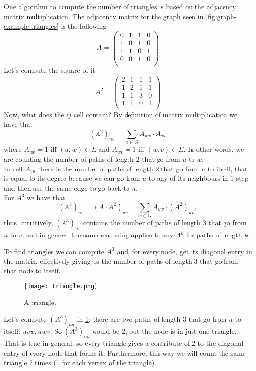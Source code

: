 One algorithm to compute the number of triangles is based on the adjacency matrix multiplication.
The adjacency matrix for the graph seen in \cref{fig:graph-example-triangles} is the following
\[
	A = \begin{pmatrix}
		0 & 1 & 1 & 0 \\
		1 & 0 & 1 & 0 \\
		1 & 1 & 0 & 1 \\
		0 & 0 & 1 & 0 \\
	\end{pmatrix}
\]
Let's compute the square of it.
\[
	A^2 = 	\begin{pmatrix}
		2 & 1 & 1 & 1 \\
		1 & 2 & 1 & 1 \\
		1 & 1 & 3 & 0 \\
		1 & 1 & 0 & 1 \\
	\end{pmatrix}
\]
Now, what does the $ij$ cell contain? By definition of matrix multiplication we have that
\[
	(A^2)_{uv} = \sum_{w \in G}A_{uw} \cdot A_{wv}
\]
where $A_{uw} = 1$ iff $(u,w) \in E$ and $A_{wv} = 1$ iff $(w,v) \in E$. In other words, we are counting the number of paths of length $2$ that go from $u$ to $w$.\\
In cell $A_{uu}$ there is the number of paths of length $2$ that go from $u$ to itself, that is equal to its degree because we can go from $u$ to any of its neighbours in $1$ step and then use the same edge to go back to $u$.\\
For $A^3$ we have that
\[
    (A^3)_{uv} = \left( A \cdot A^2 \right)_{uv} = \sum_{w \in G} A_{uw} \cdot (A^2)_{wv},
\]
thus, intuitively, $(A^3)_{uv}$ contains the number of paths of length $3$ that go from $u$ to $v$, and in general the same reasoning applies to any $A^k$ for paths of length $k$.

To find triangles we can compute $A^3$ and, for every node, get its diagonal entry in the matrix, effectively giving us the number of paths of length $3$ that go from that node to itself.

\begin{figure}[h!]
	\centering
	\texttt{[image: triangle.png]}
	\caption{A triangle.}\label{fig:triangle-graph}
\end{figure}

Let's compute $(A^3)_{uu}$ in \cref{fig:triangle-graph}; there are two paths of length $3$ that go from $u$ to itself: $uvw, uwv$. So $(A^3)_{uu}$ would be $2$, but the node is in just one triangle.
That is true in general, so every triangle gives a contribute of $2$ to the diagonal entry of every node that forms it. Furthermore, this way we will count the same triangle $3$ times (1 for each vertex of the triangle).

